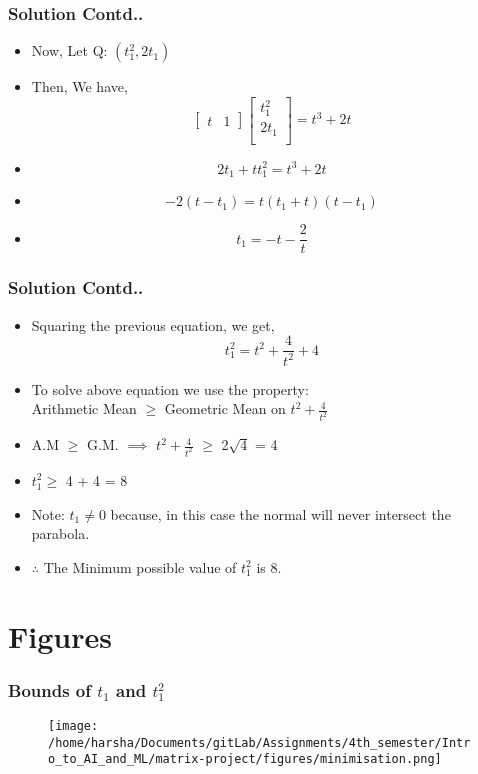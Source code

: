 \documentclass[12pt]{beamer}
\begin{document}

\begin{frame}
\frametitle{Solution Contd..}
\begin{itemize}
\item<1-5> Now, Let Q: $( t_1^2, 2t_1 )$
\item<2-5> Then, We have,
\[
\begin{bmatrix}
    t & 1  
\end{bmatrix}
\begin{bmatrix}
    t_1^2\\
    2t_1\\  
\end{bmatrix} = 
t^3 + 2t
\]
\item<3-5> \[
2t_1 + tt_1^2 = t^3 + 2t 
\]
\item<4-5>
\[
-2(t - t_1) = t(t_1 + t)(t - t_1)
\]
\item<5>
\[
t_1 = -t - \frac{2}{t}
\]
\end{itemize}
\end{frame}



\begin{frame}
\frametitle{Solution Contd..}
\begin{itemize}
\item<1-5>
Squaring the previous equation, we get,
\[
t_1^2 = t^2 + \frac{4}{t^2} + 4
\]
\item<2-5> To solve above equation we use the property:\\
Arithmetic Mean $\geq$ Geometric Mean on $t^2 + \frac{4}{t^2}$
\item<3-5> A.M $\geq$ G.M. $\implies$ $t^2 + \frac{4}{t^2}$ $\geq$ 2$\sqrt{4}$ = 4
\item<4-5> $t_1^2 \geq$ 4 + 4 = 8
\item Note: $t_1 \neq 0$ because, in this case the normal will never intersect the parabola.
\item<5> $\therefore$ The Minimum possible value of $t_1^2$ is 8.
\end{itemize}
\end{frame}

\section{Figures}

\begin{frame}
\frametitle{Bounds of $t_1$ and $t_1^2$}
\begin{figure}
\centering
\texttt{[image: /home/harsha/Documents/gitLab/Assignments/4th\_semester/Intro\_to\_AI\_and\_ML/matrix-project/figures/minimisation.png]}
\label{Bounds of $t_1$ and $t_1^2$}
\end{figure}
\end{frame}
\end{document}
